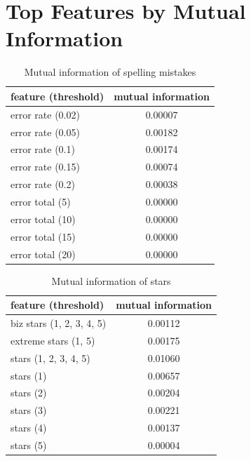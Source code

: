 \chapter{Top Features by Mutual Information}\label{app:mi}



\begin{table}[h!]

\centering
\begin{tabular}{lS[table-format=3.2]}
\toprule
\textbf{feature (threshold)} & \textbf{mutual information} \\
\midrule
error rate (0.02) & 0.00007 \\
error rate (0.05) & 0.00182 \\
error rate (0.1) & 0.00174 \\
error rate (0.15) & 0.00074 \\
error rate (0.2) & 0.00038 \\
error total (5) & 0.00000 \\
error total (10) & 0.00000 \\
error total (15) & 0.00000 \\
error total (20) & 0.00000 \\
\bottomrule
\end{tabular}

\caption{Mutual information of spelling mistakes}\label{tab:mi_errors}
\end{table}

\begin{table}[h!]

\centering
\begin{tabular}{lS[table-format=3.2]}
\toprule
\textbf{feature (threshold)} & \textbf{mutual information} \\
\midrule
biz stars (1, 2, 3, 4, 5) & 0.00112 \\
extreme stars (1, 5) & 0.00175 \\
stars (1, 2, 3, 4, 5)& 0.01060 \\
stars (1) & 0.00657 \\
stars (2) & 0.00204 \\
stars (3) & 0.00221 \\
stars (4) & 0.00137 \\
stars (5) & 0.00004 \\
\bottomrule
\end{tabular}

\caption{Mutual information of stars}\label{tab:mi_stars}
\end{table}

